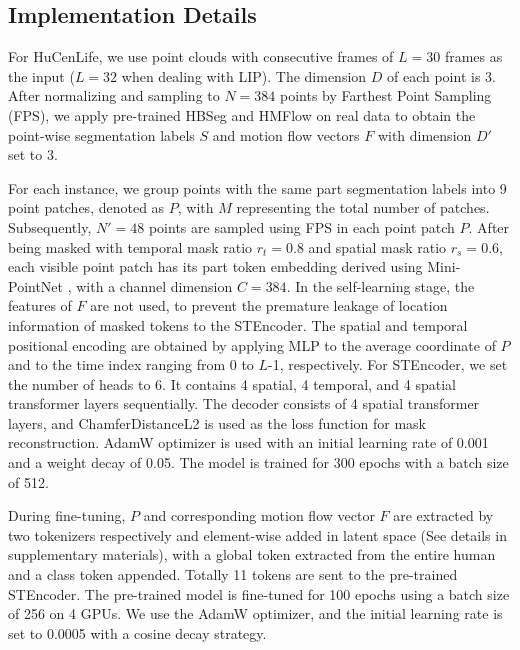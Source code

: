 


\subsection{Implementation Details}
\label{subsec:pretraining}

For HuCenLife, we use point clouds with consecutive frames of $L=30$ frames as the input ($L=32$ when dealing with LIP). The dimension $D$ of each point is 3. After normalizing and sampling to $N=384$ points by Farthest Point Sampling (FPS), we apply pre-trained HBSeg and HMFlow on real data to obtain the point-wise segmentation labels $S$ and motion flow vectors $F$ with dimension $D'$ set to 3. 

For each instance, we group points with the same part segmentation labels into 9 point patches, denoted as $P$, with $M$ representing the total number of patches.
Subsequently, $N' = 48$ points are sampled using FPS in each point patch $P$. 
After being masked with temporal mask ratio $r_t=0.8$ and spatial mask ratio $r_s = 0.6$, each visible point patch has its part token embedding derived using Mini-PointNet \cite{qi2017pointnet}, with a channel dimension $C=384$.
In the self-learning stage, the features of $F$ are not used, to prevent the premature leakage of location information of masked tokens to the STEncoder. 
The spatial and temporal positional encoding are obtained by applying MLP to the average coordinate of $P$ and to the time index ranging from 0 to $L$-1, respectively. 
For STEncoder, we set the number of heads to 6. It contains 4 spatial, 4 temporal, and 4 spatial transformer layers sequentially. 
The decoder consists of 4 spatial transformer layers, and ChamferDistanceL2 is used as the loss function for mask reconstruction.
AdamW optimizer is used with an initial learning rate of 0.001 and a weight decay of 0.05. The model is trained for 300 epochs with a batch size of 512.

During fine-tuning, $P$ and corresponding motion flow vector $F$ are extracted by two tokenizers respectively and element-wise added in latent space (See details in supplementary materials), with a global token extracted from the entire human and a class token appended. Totally 11 tokens are sent to the pre-trained STEncoder. 
The pre-trained model is fine-tuned for 100 epochs using a batch size of 256 on 4 GPUs.  We use the AdamW optimizer, and the initial learning rate is set to 0.0005 with a cosine decay strategy.








